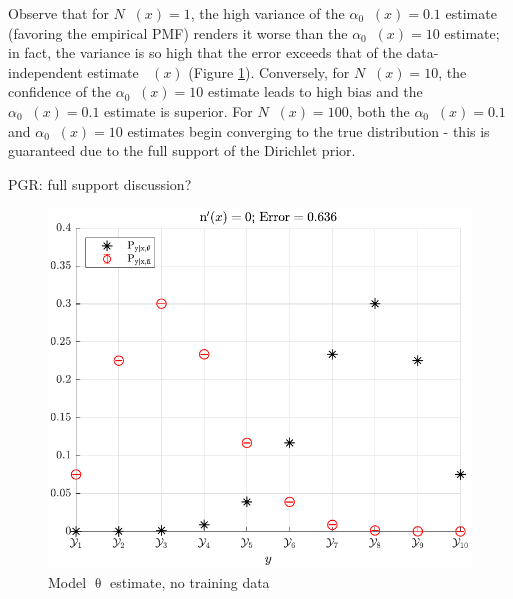 \documentclass[12pt]{report}
\DeclareMathOperator{\uppsim}{\uppsi_\text{m}}
\DeclareMathOperator{\alpham}{\alpha_\text{m}}
\DeclareMathOperator{\alphac}{\alpha_\text{c}}
\begin{document}
Observe that for $N \uppsim(x) = 1$, the high variance of the $\alpha_0 \alpham(x) = 0.1$ estimate (favoring the empirical PMF) renders it worse than the $\alpha_0 \alpham(x) = 10$ estimate; in fact, the variance is so high that the error exceeds that of the data-independent estimate $\alphac(x)$ (Figure \ref{fig:P_yx_error_N_0}). Conversely, for $N \uppsim(x) = 10$, the confidence of the $ \alpha_0 \alpham(x) = 10$ estimate leads to high bias and the $ \alpha_0 \alpham(x) = 0.1$ estimate is superior. For $N \uppsim(x) = 100$, both the $ \alpha_0 \alpham(x) = 0.1$ and $ \alpha_0 \alpham(x) = 10$ estimates begin converging to the true distribution - this is guaranteed due to the full support of the Dirichlet prior.

PGR: full support discussion?


\begin{figure}
\centering
\includegraphics[width=0.7\linewidth]{P_yx_error_N_0.pdf}
\caption{Model $\uptheta$ estimate, no training data}
\label{fig:P_yx_error_N_0}
\end{figure}
\end{document}
